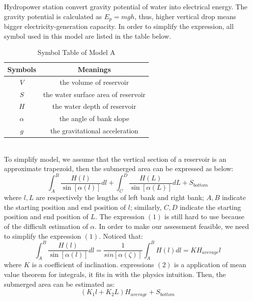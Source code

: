 \documentclass{mcmthesis}
\begin{document}
\indent Hydropower station convert gravity potential of water into electrical energy. The gravity potential is calculated as $E_{p} = mgh$, thus, higher vertical drop means bigger electricity-generation capacity. In order to simplify the expression, all symbol used in this model are listed in the table below.\\
\begin{table}[ht]
\centering
  \begin{tabular}{cc}
  \hline
  Symbols & Meanings \\
  \hline
  $V$ & the volume of reservoir \\
  $S$ & the water surface area of reservoir \\
  $H$ & the water depth of reservoir \\
  $\alpha$ & the angle of bank slope \\
  $g$ & the gravitational acceleration \\
  \hline
  \end{tabular}
\caption{Symbol Table of Model A}
\end{table}\\
\indent To simplify model, we assume that the vertical section of a reservoir is an approximate trapezoid, then the submerged area can be expressed as below:
\begin{equation}\int_{A}^{B}\frac{H\left(l\right)}{\sin\left[\alpha\left(l\right)\right]}dl + \int_{C}^{D}\frac{H\left(L\right)}{\sin\left[\alpha\left(L\right)\right]}dL + S_{bottom}\end{equation}
where $l, L$ are respectively the lengths of left bank and right bank; $A, B$ indicate the starting position and end position of $l$; similarly, $C, D$ indicate the starting position and end position of $L$.
The expression $\left(1\right)$ is still hard to use because of the difficult estimation of $\alpha$. In order to make our assessment feasible, we need to simplify the expression $\left(1\right)$. Noticed that:
\begin{equation}
\int_{A}^{B}\frac{H\left(l\right)}{\sin\left[\alpha\left(l\right)\right]}dl = \frac{1}{sin\left[\alpha\left(\zeta\right)\right]}\int_{A}^{B}H\left(l\right)dl
= KH_{average}l
\end{equation}
where $K$ is a coefficient of inclination. expressions $\left(2\right)$ is a application of mean value theorem for integrals, it fits in with the physics intuition. Then, the submerged area can be estimated as:
\begin{equation}
\left(K_{1}l + K_{2}L\right)H_{average} + S_{bottom}
\end{equation}
\end{document}

